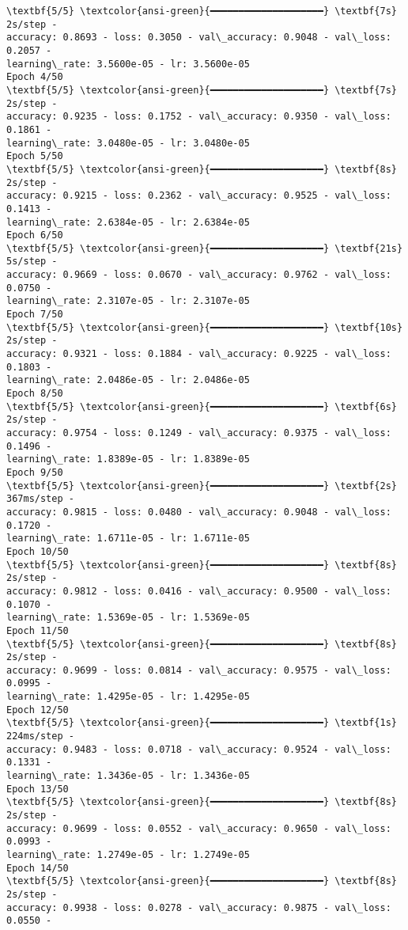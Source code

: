 \documentclass[11pt]{article}
\begin{document}
    \begin{Verbatim}[commandchars=\\\{\}]
\textbf{5/5} \textcolor{ansi-green}{━━━━━━━━━━━━━━━━━━━━} \textbf{7s} 2s/step -
accuracy: 0.8693 - loss: 0.3050 - val\_accuracy: 0.9048 - val\_loss: 0.2057 -
learning\_rate: 3.5600e-05 - lr: 3.5600e-05
Epoch 4/50
\textbf{5/5} \textcolor{ansi-green}{━━━━━━━━━━━━━━━━━━━━} \textbf{7s} 2s/step -
accuracy: 0.9235 - loss: 0.1752 - val\_accuracy: 0.9350 - val\_loss: 0.1861 -
learning\_rate: 3.0480e-05 - lr: 3.0480e-05
Epoch 5/50
\textbf{5/5} \textcolor{ansi-green}{━━━━━━━━━━━━━━━━━━━━} \textbf{8s} 2s/step -
accuracy: 0.9215 - loss: 0.2362 - val\_accuracy: 0.9525 - val\_loss: 0.1413 -
learning\_rate: 2.6384e-05 - lr: 2.6384e-05
Epoch 6/50
\textbf{5/5} \textcolor{ansi-green}{━━━━━━━━━━━━━━━━━━━━} \textbf{21s} 5s/step -
accuracy: 0.9669 - loss: 0.0670 - val\_accuracy: 0.9762 - val\_loss: 0.0750 -
learning\_rate: 2.3107e-05 - lr: 2.3107e-05
Epoch 7/50
\textbf{5/5} \textcolor{ansi-green}{━━━━━━━━━━━━━━━━━━━━} \textbf{10s} 2s/step -
accuracy: 0.9321 - loss: 0.1884 - val\_accuracy: 0.9225 - val\_loss: 0.1803 -
learning\_rate: 2.0486e-05 - lr: 2.0486e-05
Epoch 8/50
\textbf{5/5} \textcolor{ansi-green}{━━━━━━━━━━━━━━━━━━━━} \textbf{6s} 2s/step -
accuracy: 0.9754 - loss: 0.1249 - val\_accuracy: 0.9375 - val\_loss: 0.1496 -
learning\_rate: 1.8389e-05 - lr: 1.8389e-05
Epoch 9/50
\textbf{5/5} \textcolor{ansi-green}{━━━━━━━━━━━━━━━━━━━━} \textbf{2s} 367ms/step -
accuracy: 0.9815 - loss: 0.0480 - val\_accuracy: 0.9048 - val\_loss: 0.1720 -
learning\_rate: 1.6711e-05 - lr: 1.6711e-05
Epoch 10/50
\textbf{5/5} \textcolor{ansi-green}{━━━━━━━━━━━━━━━━━━━━} \textbf{8s} 2s/step -
accuracy: 0.9812 - loss: 0.0416 - val\_accuracy: 0.9500 - val\_loss: 0.1070 -
learning\_rate: 1.5369e-05 - lr: 1.5369e-05
Epoch 11/50
\textbf{5/5} \textcolor{ansi-green}{━━━━━━━━━━━━━━━━━━━━} \textbf{8s} 2s/step -
accuracy: 0.9699 - loss: 0.0814 - val\_accuracy: 0.9575 - val\_loss: 0.0995 -
learning\_rate: 1.4295e-05 - lr: 1.4295e-05
Epoch 12/50
\textbf{5/5} \textcolor{ansi-green}{━━━━━━━━━━━━━━━━━━━━} \textbf{1s} 224ms/step -
accuracy: 0.9483 - loss: 0.0718 - val\_accuracy: 0.9524 - val\_loss: 0.1331 -
learning\_rate: 1.3436e-05 - lr: 1.3436e-05
Epoch 13/50
\textbf{5/5} \textcolor{ansi-green}{━━━━━━━━━━━━━━━━━━━━} \textbf{8s} 2s/step -
accuracy: 0.9699 - loss: 0.0552 - val\_accuracy: 0.9650 - val\_loss: 0.0993 -
learning\_rate: 1.2749e-05 - lr: 1.2749e-05
Epoch 14/50
\textbf{5/5} \textcolor{ansi-green}{━━━━━━━━━━━━━━━━━━━━} \textbf{8s} 2s/step -
accuracy: 0.9938 - loss: 0.0278 - val\_accuracy: 0.9875 - val\_loss: 0.0550 -

\end{Verbatim}
\end{document}
